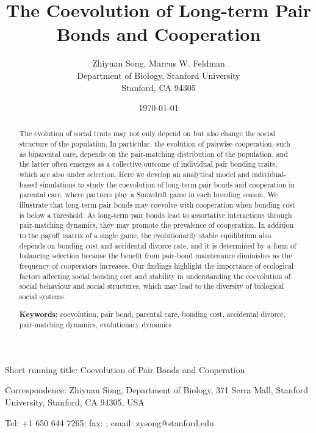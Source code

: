 \documentclass[12pt]{article}
\begin{document}
\linenumbers
\doublespacing

\title{The Coevolution of Long-term Pair Bonds and Cooperation}
\author{Zhiyuan Song, Marcus W. Feldman\\
				Department of Biology, Stanford University\\
				Stanford, CA 94305}
\date{\today}
\maketitle
Short running title: Coevolution of Pair Bonds and Cooperation 

Correspondence: Zhiyuan Song, Department of Biology, 371 Serra Mall, Stanford University, Stanford, CA 94305, USA

Tel: +1 650 644 7265; fax:  ; email: zysong@stanford.edu

\newpage

\begin{abstract}

The evolution of social traits may not only depend on but also change the social structure of the population. In particular, the evolution of pairwise cooperation, such as biparental care, depends on the pair-matching distribution of the population, and the latter often emerges as a collective outcome of individual pair bonding traits, which are also under selection. Here we develop an analytical model and individual-based simulations to study the coevolution of long-term pair bonds and cooperation in parental care, where partners play a Snowdrift game in each breeding season. We illustrate that long-term pair bonds may coevolve with cooperation when bonding cost is below a threshold. As long-term pair bonds lead to assortative interactions through pair-matching dynamics, they may promote the prevalence of cooperation. In addition to the payoff matrix of a single game, the evolutionarily stable equilibrium also depends on bonding cost and accidental divorce rate, and it is determined by a form of balancing selection because the benefit from pair-bond maintenance diminishes as the frequency of cooperators increases. Our findings highlight the importance of ecological factors affecting social bonding cost and stability in understanding the coevolution of social behaviour and social structures, which may lead to the diversity of biological social systems.

{\bf Keywords:} coevolution, pair bond, parental care, bonding cost, accidental divorce, pair-matching dynamics, evolutionary dynamics
\end{abstract}
\end{document}
